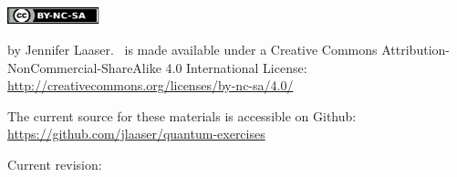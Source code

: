 %
%
%
%

\begin{titlepage}
\makeatletter
\centering

~

\vspace{1.5in}
{\LARGE \@title }
\vspace{0.5in}



\includegraphics[width=0.2\textwidth]{by-nc-sa}
\vspace{0.1in}

\begin{minipage}{0.75\textwidth}
 by Jennifer Laaser. \@title\ is made available under a Creative Commons Attribution-NonCommercial-ShareAlike 4.0 International License: \url{http://creativecommons.org/licenses/by-nc-sa/4.0/}

\vspace{0.1in}

The current source for these materials is accessible on Github:\\ \url{https://github.com/jlaaser/quantum-exercises}
\end{minipage}


\vspace{0.5in}
Current revision: \@date

\end{titlepage}

\makeatother
\newpage